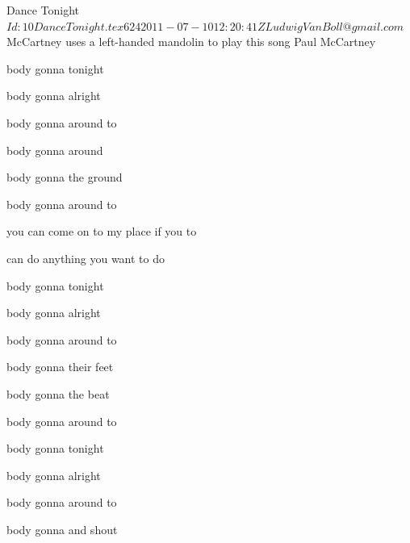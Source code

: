 \begin{SBSong}{Dance Tonight}
  {$Id: 10DanceTonight.tex 624 2011-07-10 12:20:41Z LudwigVanBoll@gmail.com $}
  {McCartney uses a left-handed mandolin to play this song}
  {Paul McCartney}
  \begin{SBVerse}
    body gonna  tonight

    body gonna  alright

    body gonna  around to

    body gonna  around
    
    body gonna  the ground
    
    body gonna  around to
  \end{SBVerse}
  \begin{SBChorus}
     you can come on to my place if you  to
    
     can do anything you want to do 
  \end{SBChorus}
  \begin{SBVerse}
    body gonna  tonight

    body gonna  alright

    body gonna  around to

    body gonna  their feet

    body gonna  the beat
  
    body gonna  around to
  \end{SBVerse}
  \begin{SBVerse}
    body gonna  tonight

    body gonna  alright

    body gonna  around to

    body gonna  and shout


\end{SBVerse}
\end{SBSong}
